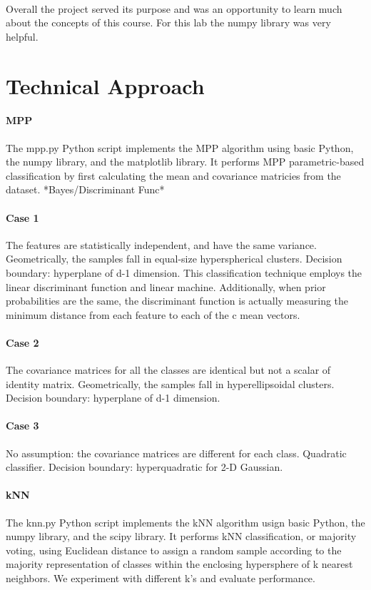 \documentclass{article}
\begin{document}
\paragraph{} 
Overall the project served its purpose and was an opportunity to learn
much about the concepts of this course. For this lab the 
numpy library was very helpful.
\newpage


\section*{Technical Approach}
\paragraph{MPP} 
The mpp.py Python script implements the MPP algorithm using basic Python, the numpy library,
and the matplotlib library.  It performs MPP parametric-based classification by first
calculating the mean and covariance matricies from the dataset.
*Bayes/Discriminant Func*
\paragraph{Case 1}
The features are statistically independent, and have the same variance.  
Geometrically, the samples fall in equal-size hyperspherical clusters.  
Decision boundary: hyperplane of d-1 dimension.  This classification technique employs the
linear discriminant function and linear machine.  Additionally, when prior probabilities are
the same, the discriminant function is actually measuring the minimum distance from each
feature to each of the c mean vectors.
\paragraph{Case 2}
The covariance matrices for all the classes are identical but not a scalar of identity matrix.
Geometrically, the samples fall in hyperellipsoidal clusters.  
Decision boundary: hyperplane of d-1 dimension.
\paragraph{Case 3}
No assumption: the covariance matrices are different for each class.  
Quadratic classifier.  
Decision boundary: hyperquadratic for 2-D Gaussian.

\paragraph{kNN} 
The knn.py Python script implements the kNN algorithm usign basic Python, the numpy library,
and the scipy library.  It performs kNN classification, or majority voting, using Euclidean
distance to assign a random sample according to the majority representation of classes
within the enclosing hypersphere of k nearest neighbors.  We experiment with different k's
and evaluate performance.
\end{document}
